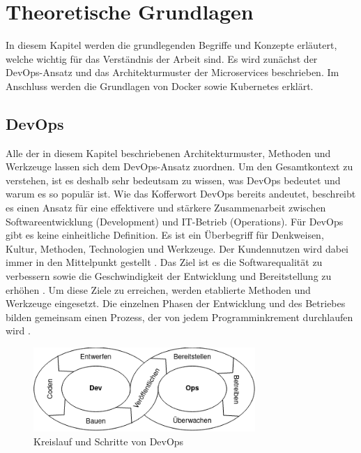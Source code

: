 \section{Theoretische Grundlagen}

In diesem Kapitel werden die grundlegenden Begriffe und Konzepte erläutert, welche wichtig für das Verständnis der Arbeit sind. Es wird zunächst der DevOps-Ansatz und das Architekturmuster der Microservices beschrieben. Im Anschluss werden die Grundlagen von Docker sowie Kubernetes erklärt.

\subsection{DevOps}

Alle der in diesem Kapitel beschriebenen Architekturmuster, Methoden und Werkzeuge lassen sich dem DevOps-Ansatz zuordnen. Um den Gesamtkontext zu verstehen, ist es deshalb sehr bedeutsam zu wissen, was DevOps bedeutet und warum es so populär ist. Wie das Kofferwort \glqq DevOps\grqq{} bereits andeutet, beschreibt es einen Ansatz für eine effektivere und stärkere Zusammenarbeit zwischen Softwareentwicklung (Development) und IT-Betrieb (Operations). Für DevOps gibt es keine einheitliche Definition. Es ist ein Überbegriff für Denkweisen, Kultur, Methoden, Technologien und Werkzeuge. Der Kundennutzen wird dabei immer in den Mittelpunkt gestellt \parencite[vgl.][S. 1]{halstenbergDevOps2020}. Das Ziel ist es die Softwarequalität zu verbessern sowie die Geschwindigkeit der Entwicklung und Bereitstellung zu erhöhen \parencite[vgl.][S. 6]{arundelCloud2019}. Um diese Ziele zu erreichen, werden etablierte Methoden und Werkzeuge eingesetzt. Die einzelnen Phasen der Entwicklung und des Betriebes bilden gemeinsam einen Prozess, der von jedem Programminkrement durchlaufen wird \parencite[vgl.][S. 63]{trempArchitekturen2021}.

\begin{figure}[H] 
    \centering
    \includegraphics[width=0.75\textwidth]{figures/DevOpsKreislauf.png}
    \caption{Kreislauf und Schritte von DevOps \parencite[vgl.][S. 63]{trempArchitekturen2021}}
\end{figure}

